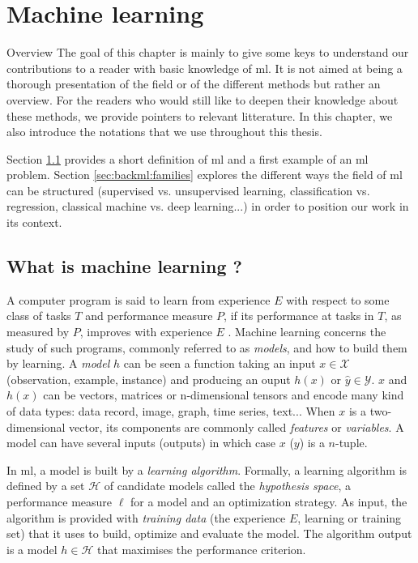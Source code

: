 \chapter{Machine learning}
\label{chap:backml}

\begin{overview}{Overview}
The goal of this chapter is mainly to give some keys to understand our contributions to a reader with basic knowledge of \acrlong{ml}. It is not aimed at being a thorough presentation of the field or of the different methods but rather an overview. For the readers who would still like to deepen their knowledge about these methods, we provide pointers to relevant litterature. In this chapter, we also introduce the notations that we use throughout this thesis. 

Section \ref{sec:backml:whatisml} provides a short definition of \acrlong{ml} and a first example of an \acrshort{ml} problem. Section \ref{sec:backml:families} explores the different ways the field of \acrlong{ml} can be structured (\eg supervised vs. unsupervised learning, classification vs. regression, classical machine vs. deep learning...) in order to position our work in its context.   
\end{overview}

\section{What is machine learning ?} 
\label{sec:backml:whatisml}

A computer program is said to learn from experience $E$ with respect to some class of tasks $T$ and performance measure $P$, if its performance at tasks in $T$, as measured by $P$, improves with experience $E$ \parencite{mitchell1997machine}. Machine learning concerns the study of such programs, commonly referred to as \textit{models}, and how to build them by learning. A \textit{model} $h$ can be seen a function taking an input $x \in \mathcal{X}$ (\aka observation, example, instance) and producing an ouput $h(x)$ or $\hat{y} \in \mathcal{Y}$. $x$ and $h(x)$ can be vectors, matrices or n-dimensional tensors and encode many kind of data types: data record, image, graph, time series, text... When $x$ is a two-dimensional vector, its components are commonly called \textit{features} or \textit{variables}. A model can have several inputs (\resp outputs) in which case $x$ (\resp $y$) is a $n$-tuple.

In \acrlong{ml}, a model is built by a \textit{learning algorithm}. Formally, a learning algorithm is defined by a set $\mathcal{H}$ of candidate models called the \textit{hypothesis space}, a performance measure $\ell$ for a model and an optimization strategy. As input, the algorithm is provided with \textit{training data} (the experience $E$, \aka learning or training set) that it uses to build, optimize and evaluate the model. The algorithm output is a model $h \in \mathcal{H}$ that maximises the performance criterion. 

